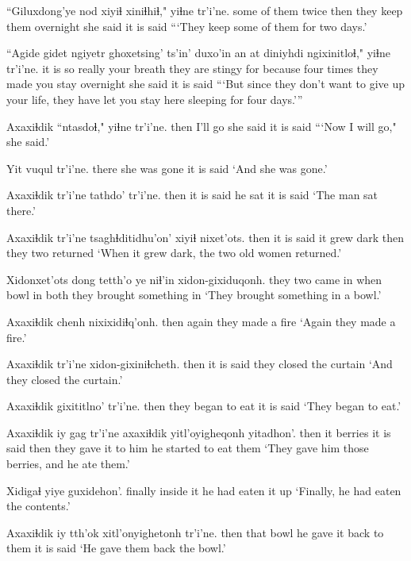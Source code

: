 \documentclass[12pt]{article}
\begin{document}
\gll ``Giluxdong'ye nod  xiyiɬ xiniɬhiɬ,"   yiɬne  tr'i'ne.
{some of them} twice then {they keep them overnight} {she said} {it is said}
\glt ```They keep some of them for two days.'
\glend

\gll ``Agide gidet ngiyetr ghoxetsing'   ts'in'  duxo'in  {an at} diniyhdi ngixinitloɬ,"    yiɬne  tr'i'ne.
{it is so} really {your breath} {they are stingy for} {}  because {} {four times} {they made you stay overnight} {she said} {it is said}
\glt ```But since they don't want to give up your life, they have let you stay here sleeping for four days.'''
\glend

\gll Axaxiɬdik ``ntasdoɬ," yiɬne  tr'i'ne.
then  {I'll go} {she said} {it is said}
\glt ```Now I will go," she said.'
\glend

\gll Yit vuqul  tr'i'ne.
there {she was gone} {it is said}
\glt `And she was gone.'
\glend

\gll Axaxiɬdik tr'i'ne tathdo' tr'i'ne.
then  {it is said} {he sat} {it is said}
\glt `The man sat there.'
\glend

\gll Axaxiɬdik tr'i'ne tsaghɬditidhu'on' xiyiɬ nixet'ots.
then  {it is said} {it grew dark}  then {they two returned}
\glt `When it grew dark, the two old women returned.'
\glend

\gll Xidonxet'ots dong tetth'o ye niɬ'in xidon-gixiduqonh.
{they two came in} when bowl in both {they brought something in}
\glt `They brought something in a bowl.'
\glend

\gll Axaxiɬdik chenh nixixidiɬq'onh.
then  again {they made a fire}
\glt `Again they made a fire.'
\glend

\gll Axaxiɬdik tr'i'ne xidon-gixiniɬcheth.
then  {it is said} {they closed the curtain}
\glt `And they closed the curtain.'
\glend

\gll Axaxiɬdik gixititlno'  tr'i'ne.
then  {they began to eat} {it is said}
\glt `They began to eat.'
\glend

\gll Axaxiɬdik iy gag tr'i'ne axaxiɬdik yitl'oyigheqonh yitadhon'.
then  it berries {it is said} then  {they gave it to him} {he started to eat them}
\glt `They gave him those berries, and he ate them.'
\glend

\gll Xidigaɬ yiye  guxidehon'.
finally  {inside it} {he had eaten it up}
\glt `Finally, he had eaten the contents.'
\glend

\gll Axaxiɬdik iy tth'ok  xitl'onyighetonh tr'i'ne.
then  that bowl  {he gave it back to them} {it is said}
\glt `He gave them back the bowl.'
\glend
\end{document}
